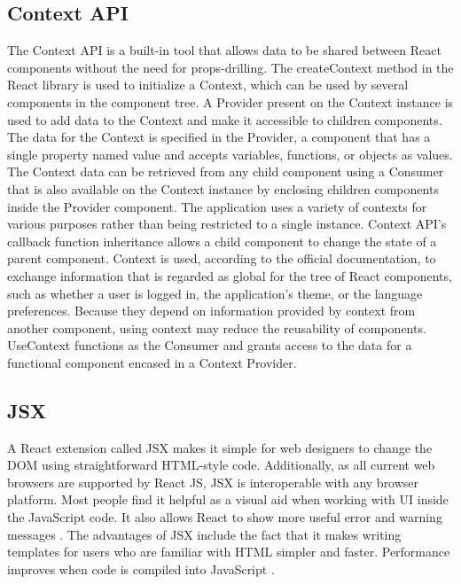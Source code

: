 \subsection{Context API}
The Context API is a built-in tool that allows data to be shared between React components without the need for props-drilling. The createContext method in the React library is used to initialize a Context, which can be used by several components in the component tree. A Provider present on the Context instance is used to add data to the Context and make it accessible to children components. The data for the Context is specified in the Provider, a component that has a single property named value and accepts variables, functions, or objects as values. The Context data can be retrieved from any child component using a Consumer that is also available on the Context instance by enclosing children components inside the Provider component. The application uses a variety of contexts for various purposes rather than being restricted to a single instance.
Context API's callback function inheritance allows a child component to change the state of a parent component. Context is used, according to the official documentation, to exchange information that is regarded as global for the tree of React components, such as whether a user is logged in, the application's theme, or the language preferences. Because they depend on information provided by context from another component, using context may reduce the reusability of components. UseContext functions as the Consumer and grants access to the data for a functional component encased in a Context Provider.

\subsection{JSX}
A React extension called JSX makes it simple for web designers to change the DOM using straightforward HTML-style code. Additionally, as all current web browsers are supported by React JS, JSX is interoperable with any browser platform.
Most people find it helpful as a visual aid when working with UI inside the JavaScript code. It also allows React to show more useful error and warning messages \autocite{react2020introducing}. The advantages of JSX include the fact that it makes writing templates for users who are familiar with HTML simpler and faster. Performance improves when code is compiled into JavaScript \autocite{phan2020react}.


